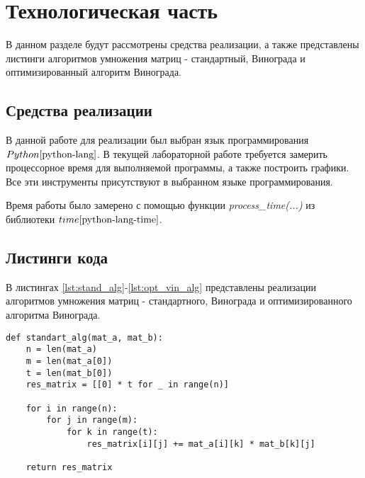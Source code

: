 \chapter{Технологическая часть}

В данном разделе будут рассмотрены средства реализации, а также представлены листинги алгоритмов умножения матриц - стандартный, Винограда и оптимизированный алгоритм Винограда.

\section{Средства реализации}
В данной работе для реализации был выбран язык программирования $Python \cite{python-lang}$. В текущей лабораторной работе требуется замерить процессорное время для выполняемой программы, а также построить графики. Все эти инструменты присутствуют в выбранном языке программирования.

Время работы было замерено с помощью функции \textit{process\_time(...)} из библиотеки $time \cite{python-lang-time}$.


\section{Листинги кода}

В листингах \ref{lst:stand_alg}-\ref{lst:opt_vin_alg} представлены реализации алгоритмов умножения матриц - стандартного, Винограда и оптимизированного алгоритма Винограда.

\begin{center}
    \captionsetup{justification=raggedright,singlelinecheck=off}
    \begin{lstlisting}[label=lst:stand_alg,caption=Стандартный алгоритм умножения матриц]
def standart_alg(mat_a, mat_b):
	n = len(mat_a)
	m = len(mat_a[0])
	t = len(mat_b[0])
	res_matrix = [[0] * t for _ in range(n)]

	for i in range(n):
		for j in range(m):
			for k in range(t):
				res_matrix[i][j] += mat_a[i][k] * mat_b[k][j]

	return res_matrix
\end{lstlisting}
\end{center}


